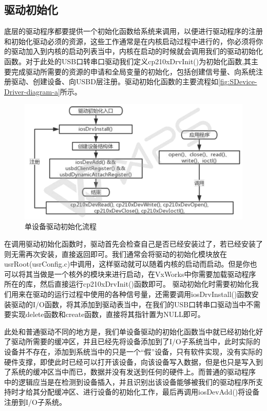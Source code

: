 \subsection{驱动初始化} 
	
	底层的驱动程序都要提供一个初始化函数给系统来调用，以便进行驱动程序的注册和初始化驱动必须的资源，这些工作通常是在内核启动过程中进行的，你必须将你的驱动加入到内核的启动列表当中，内核在启动的时候就会调用我们的驱动初始化函数。对于此处的USB口转串口驱动我们定义cp210xDrvInit()为初始化函数,其主要完成驱动所需要的资源的申请和全局变量的初始化，包括创建信号量、向系统注册驱动、创建设备、向USBD层注册。驱动初始化函数的主要流程如\autoref{fig:SDevice-Driver-diagram-a}所示。
	
\begin{figure}[!h]
\centering
\includegraphics[width=1.0\textwidth]{./graphics/SDev-Drv-Diagram-a.pdf}
\caption{单设备驱动初始化流程}\label{fig:SDevice-Driver-diagram-a}
\end{figure}



	在调用驱动初始化函数时，驱动首先会检查自己是否已经安装过了，若已经安装了则无需再次安装，直接返回即可。我们通常会将驱动的初始化模块放在usrRoot(usrConfig.c)中调用，这样驱动就可以随着内核的启动而启动。但是你也可以将其当做是一个核外的模块来进行启动，在VxWorks中你需要加载驱动程序所在的库，然后直接运行cp210xDrvInit()函数即可。
	驱动初始化时需要初始化我们用来在驱动的运行过程中使用的各种信号量，还需要调用iosDrvInstall()函数安装驱动的I/O函数，将其添加到驱动表当中，在我们的USB口转串口驱动当中不需要实现delete函数和create函数，直接将其指针置为NULL即可。
	
	此处和普通驱动不同的地方是，我们单设备驱动的初始化函数当中就已经初始化好了驱动所需要的缓冲区，并且已经先将设备添加到了I/O子系统当中，此时实际的设备并不存在，添加到系统当中的只是一个“假”设备，只有软件实现，没有实际的硬件支撑，即使此时已经可以打开该设备，向该设备写入数据，但是也只是写入到了系统的缓冲区当中而已，数据并没有发送到任何的硬件上。而普通的驱动程序 中的逻辑应当是在检测到设备插入，并且识别出该设备能够被我们的驱动程序所支持时才给其分配缓冲区、进行设备的初始化工作，最后再调用iosDevAdd()将设备注册到I/O子系统。
	
